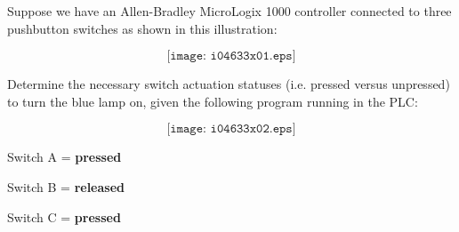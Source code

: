 

Suppose we have an Allen-Bradley MicroLogix 1000 controller connected to three pushbutton switches as shown in this illustration:

$$\texttt{[image: i04633x01.eps]}$$

Determine the necessary switch actuation statuses (i.e. pressed versus unpressed) to turn the blue lamp on, given the following program running in the PLC:

$$\texttt{[image: i04633x02.eps]}$$







Switch A = {\bf pressed}

\vskip 10pt

Switch B = {\bf released}

\vskip 10pt

Switch C = {\bf pressed}











